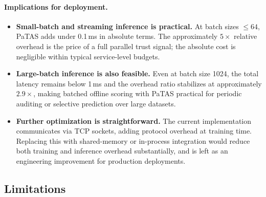 \paragraph{Implications for deployment.}
\begin{itemize}
    \item \textbf{Small-batch and streaming inference is practical.} At batch sizes $\leq 64$, \ac{PaTAS} adds under 0.1\,ms in absolute terms. The approximately $5\times$ relative overhead is the price of a full parallel trust signal; the absolute cost is negligible within typical service-level budgets.

    \item \textbf{Large-batch inference is also feasible.} Even at batch size 1024, the total latency remains below 1\,ms and the overhead ratio stabilizes at approximately $2.9\times$, making batched offline scoring with \ac{PaTAS} practical for periodic auditing or selective prediction over large datasets.

    \item \textbf{Further optimization is straightforward.} The current implementation communicates via \ac{TCP} sockets, adding protocol overhead at training time. Replacing this with shared-memory or in-process integration would reduce both training and inference overhead substantially, and is left as an engineering improvement for production deployments.
\end{itemize}

\subsection{Limitations}
\label{sec:limitations}

